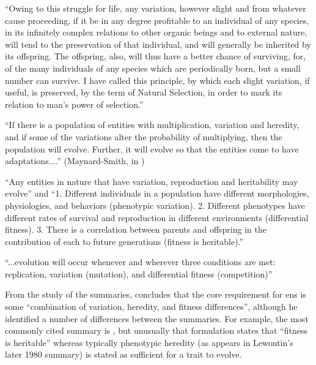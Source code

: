 \begin{compactenum}
\item ``Owing to this struggle for life, any variation, however slight and from whatever cause proceeding, if it be in any degree profitable to an individual of any species, in its infinitely complex relations to other organic beings and to external nature, will tend to the preservation of that individual, and will generally be inherited by its offspring. The offspring, also, will thus have a better chance of surviving, for, of the many individuals of any species which are periodically born, but a small number can survive. I have called this principle, by which each slight variation, if useful, is preserved, by the term of Natural Selection, in order to mark its relation to man's power of selection.'' \parencite{Darwin1859}
\item ``If there is a population of entities with multiplication, variation and heredity, and if some of the variations alter the probability of multiplying, then the population will evolve. Further, it will evolve so that the entities come to have adaptations....'' (Maynard-Smith, in \textcite{Griesemer2001})
\item ``Any entities in nature that have variation, reproduction and heritability may evolve'' \parencite{Lewontin:1970mc} and ``1. Different individuals in a population have different morphologies, physiologies, and behaviors (phenotypic variation). 2. Different phenotypes have different rates of survival and reproduction in different environments (differential fitness). 3. There is a correlation between parents and offspring in the contribution of each to future generations (fitness is heritable).'' \textcite{Lewontin:1970mc}
\item ``...evolution will occur whenever and wherever three conditions are met: replication, variation (mutation), and differential fitness (competition)'' \parencite[quoting Daniel Dennett]{Ofria2004}
\end{compactenum}

From the study of the summaries, \textcite{Godfrey-Smith2007} concludes that the core requirement for \gls{ens} is some ``combination of variation, heredity, and fitness differences'', although he identified a number of differences between the summaries. For example, the most commonly cited summary is \textcite{Lewontin:1970mc}, but unusually that formulation states that ``fitness is heritable'' whereas typically phenotypic heredity (as appears in Lewontin's later 1980 summary) is stated as sufficient for a trait to evolve. 

